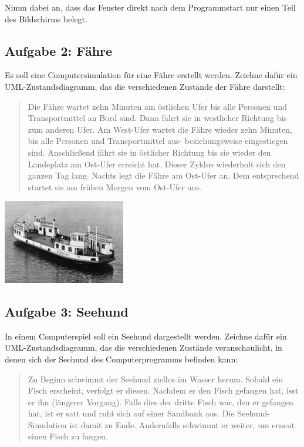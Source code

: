 Nimm dabei an, dass das Fenster direkt nach dem Programmstart nur einen Teil des
Bildschirms belegt.



\subsection{Aufgabe 2: Fähre}

Es soll eine Computersimulation für eine Fähre erstellt werden. Zeichne dafür
ein UML-Zustandsdiagramm, das die verschiedenen Zustände der Fähre darstellt:

\begin{quotation}
Die Fähre wartet zehn Minuten am östlichen Ufer
bis alle Personen und Transportmittel an Bord
sind. Dann fährt sie in westlicher Richtung bis zum
anderen Ufer. Am West-Ufer wartet die Fähre
wieder zehn Minuten, bis alle Personen und
Transportmittel aus- beziehungsweise
eingestiegen sind. Anschließend fährt sie in
östlicher Richtung bis sie wieder den Landeplatz
am Ost-Ufer erreicht hat. Dieser Zyklus wiederholt
sich den ganzen Tag lang. Nachts legt die Fähre
am Ost-Ufer an. Dem entsprechend startet sie am
frühen Morgen vom Ost-Ufer aus.
\end{quotation}

\begin{center}
\includegraphics[width=0.4\textwidth]{./inf/SEKII/11_UML_Zustandsdiagramme/faehre.png}
\end{center}
%
%
%

\subsection{Aufgabe 3: Seehund}

In einem Computerspiel soll ein Seehund dargestellt werden.
Zeichne dafür ein UML-Zustandsdiagramm, das die
verschiedenen Zustände veranschaulicht, in denen sich der
Seehund des Computerprogramms befinden kann:

\begin{quotation}
Zu Beginn schwimmt der Seehund ziellos im Wasser herum.
Sobald ein Fisch erscheint, verfolgt er diesen. Nachdem er den
Fisch gefangen hat, isst er ihn (längerer Vorgang). Falls dies der
dritte Fisch war, den er gefangen hat, ist er satt und ruht sich auf
einer Sandbank aus. Die Seehund-Simulation ist damit zu Ende.
Andernfalls schwimmt er weiter, um erneut einen Fisch zu
fangen.
\end{quotation}


